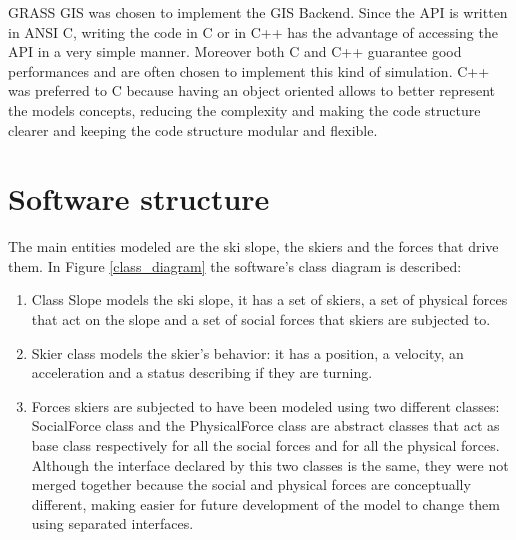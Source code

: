 \documentclass[12pt,a4paper,twoside]{book}
\begin{document}
GRASS GIS was chosen to implement the GIS Backend. Since the API is written in ANSI C, writing the code in C or in C++ has the advantage of accessing the API in a very simple manner. Moreover both C and C++ guarantee good performances and are often chosen to implement this kind of simulation. C++ was preferred to C because having an object oriented allows to better represent the models concepts, reducing the complexity and making the code structure clearer and keeping the code structure modular and flexible.

\section{Software structure}
The main entities modeled are the ski slope, the skiers and the forces that drive them. In Figure \ref{class_diagram} the software's class diagram is described:
\begin{enumerate}
\item Class Slope models the ski slope, it has a set of skiers, a set of physical forces that act on the slope and a set of social forces that skiers are subjected to.
\item Skier class models the skier's behavior: it has a position, a velocity, an acceleration and a status describing if they are turning.
\item Forces skiers are subjected to have been modeled using two different classes: SocialForce class and the PhysicalForce class are abstract classes that act as base class respectively for all the social forces and for all the physical forces. Although the interface declared by this two classes is the same, they were not merged together because the social and physical forces are conceptually different, making easier for future development of the model to change them using separated interfaces.
\end{enumerate}
\end{document}
